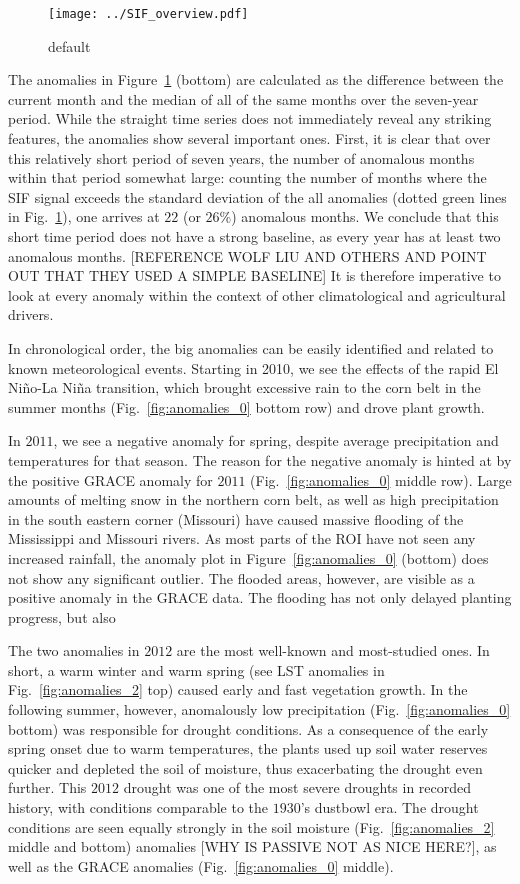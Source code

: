 \documentclass[preprint, a4paper, 10pt, times]{elsarticle}
\begin{document}
\begin{figure}[htbp]
\centering
\texttt{[image: ../SIF\_overview.pdf]}
\caption{default}
\label{fig:sif_ts}
\end{figure}

The anomalies in Figure~\ref{fig:sif_ts} (bottom) are calculated as the difference between the current month and the median of all of the same months over the seven-year period. While the straight time series does not immediately reveal any striking features, the anomalies show several important ones. First, it is clear that over this relatively short period of seven years, the number of anomalous months within that period somewhat large: counting the number of months where the SIF signal exceeds the standard deviation of the all anomalies (dotted green lines in Fig.~\ref{fig:sif_ts}), one arrives at $22$ (or $26\%$) anomalous months. We conclude that this short time period does not have a strong baseline, as every year has at least two anomalous months. [REFERENCE WOLF LIU AND OTHERS AND POINT OUT THAT THEY USED A SIMPLE BASELINE] It is therefore imperative to look at every anomaly within the context of other climatological and agricultural drivers.

In chronological order, the big anomalies can be easily identified and related to known meteorological events. Starting in 2010, we see the effects of the rapid El Ni\~no-La Ni\~na transition, which brought excessive rain to the corn belt in the summer months (Fig.~\ref{fig:anomalies_0} bottom row) and drove plant growth.

In $2011$, we see a negative anomaly for spring, despite average precipitation and temperatures for that season. The reason for the negative anomaly is hinted at by the positive GRACE anomaly for $2011$ (Fig.~\ref{fig:anomalies_0} middle row). Large amounts of melting snow in the northern corn belt, as well as high precipitation in the south eastern corner (Missouri) have caused massive flooding of the Mississippi and Missouri rivers. As most parts of the ROI have not seen any increased rainfall, the anomaly plot in Figure~\ref{fig:anomalies_0} (bottom) does not show any significant outlier. The flooded areas, however, are visible as a positive anomaly in the GRACE data. The flooding has not only delayed planting progress, but also 

The two anomalies in $2012$ are the most well-known and most-studied ones. In short, a warm winter and warm spring (see LST anomalies in Fig.~\ref{fig:anomalies_2} top) caused early and fast vegetation growth. In the following summer, however, anomalously low precipitation (Fig.~\ref{fig:anomalies_0} bottom) was responsible for drought conditions. As a consequence of the early spring onset due to warm temperatures, the plants used up soil water reserves quicker and depleted the soil of moisture, thus exacerbating the drought even further. This $2012$ drought was one of the most severe droughts in recorded history, with conditions comparable to the $1930$'s dustbowl era. The drought conditions are seen equally strongly in the soil moisture (Fig.~\ref{fig:anomalies_2} middle and bottom) anomalies [WHY IS PASSIVE NOT AS NICE HERE?], as well as the GRACE anomalies (Fig.~\ref{fig:anomalies_0} middle). 
\end{document}
